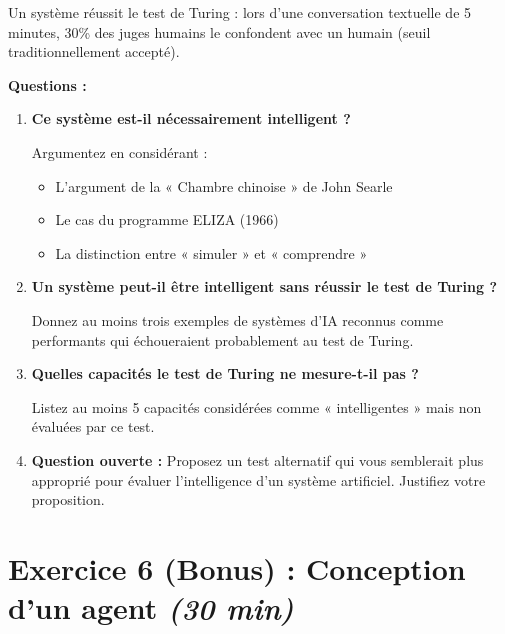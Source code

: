 \documentclass[11pt,a4paper]{article}
\begin{document}
\begin{exercicebox}[Énoncé]
Un système réussit le test de Turing : lors d'une conversation textuelle de 5 minutes, 30\% des juges humains le confondent avec un humain (seuil traditionnellement accepté).

\textbf{Questions :}
\begin{enumerate}
    \item \textbf{Ce système est-il nécessairement intelligent ?} 
    
    Argumentez en considérant :
    \begin{itemize}
        \item L'argument de la « Chambre chinoise » de John Searle
        \item Le cas du programme ELIZA (1966)
        \item La distinction entre « simuler » et « comprendre »
    \end{itemize}
    
    \item \textbf{Un système peut-il être intelligent sans réussir le test de Turing ?}
    
    Donnez au moins trois exemples de systèmes d'IA reconnus comme performants qui échoueraient probablement au test de Turing.
    
    \item \textbf{Quelles capacités le test de Turing ne mesure-t-il pas ?}
    
    Listez au moins 5 capacités considérées comme « intelligentes » mais non évaluées par ce test.
    
    \item \textbf{Question ouverte :} Proposez un test alternatif qui vous semblerait plus approprié pour évaluer l'intelligence d'un système artificiel. Justifiez votre proposition.
\end{enumerate}
\end{exercicebox}

\vspace{1cm}

\section*{Exercice 6 (Bonus) : Conception d'un agent \hfill \textit{(30 min)}}
\end{document}
